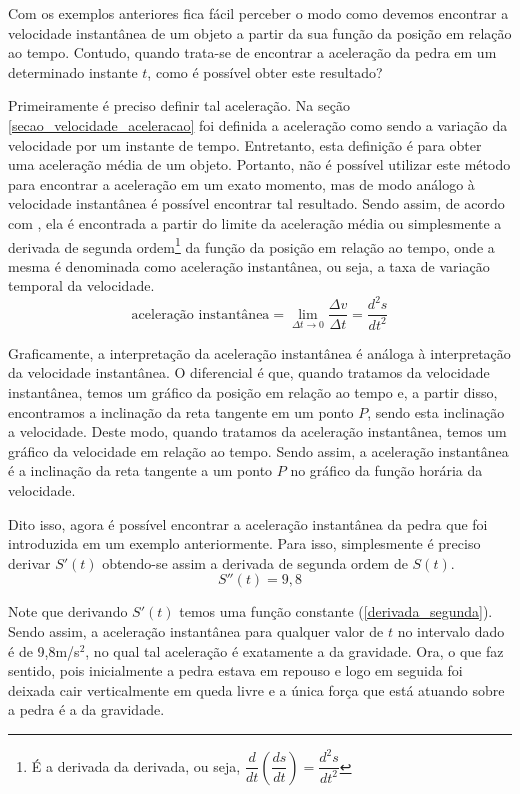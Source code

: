 \documentclass[
	12pt,				%
	openright,			%
    twoside,			%
	a4paper,			%
	chapter=TITLE,		%
	english,			%
	french,				%
	spanish,			%
	brazil				%
	]{abntex2}
\numberwithin{lema}{chapter}
\numberwithin{teorema}{chapter}
\numberwithin{definicao}{chapter}
\numberwithin{exemplo}{chapter}
\numberwithin{figure}{chapter}
\begin{document}
Com os exemplos anteriores fica fácil perceber o modo como devemos encontrar a velocidade instantânea de um objeto a partir da sua função da posição em relação ao tempo. Contudo, quando trata-se de encontrar a aceleração da pedra em um determinado instante $t$, como é possível obter este resultado? 

Primeiramente é preciso definir tal aceleração. Na seção \ref{secao_velocidade_aceleracao} foi definida a aceleração como sendo a variação da velocidade por um instante de tempo. Entretanto, esta definição é para obter uma aceleração média de um objeto. Portanto, não é possível utilizar este método para encontrar a aceleração em um exato momento, mas de modo análogo à velocidade instantânea é possível encontrar tal resultado. Sendo assim, de acordo com , ela é encontrada a partir do limite da aceleração média ou simplesmente a derivada de segunda ordem\footnote{É a derivada da derivada, ou seja, $\dfrac{d}{dt}\left( \dfrac{ds}{dt} \right) = \dfrac{d^{2}s}{dt^{2}}$} da função da posição em relação ao tempo, onde a mesma é denominada como aceleração instantânea, ou seja, a taxa de variação temporal da velocidade.
\begin{equation}
	\text{aceleração instantânea} = \lim_{\Delta t\rightarrow 0} \frac{\Delta v}{\Delta t} = \dfrac{d^2s}{dt^2}
\end{equation}

Graficamente, a interpretação da aceleração instantânea é análoga à interpretação da velocidade instantânea. O diferencial é que, quando tratamos da velocidade instantânea, temos um gráfico da posição em relação ao tempo e, a partir disso, encontramos a inclinação da reta tangente em um ponto $P$, sendo esta inclinação a velocidade. Deste modo, quando tratamos da aceleração instantânea, temos um gráfico da velocidade em relação ao tempo. Sendo assim, a aceleração instantânea é a inclinação da reta tangente a um ponto $P$ no gráfico da função horária da velocidade.

Dito isso, agora é possível encontrar a aceleração instantânea da pedra que foi introduzida em um exemplo anteriormente. Para isso, simplesmente é preciso derivar $S'(t)$ obtendo-se assim a derivada de segunda ordem de $S(t)$. 
\begin{equation}
	\label{derivada_segunda}
	S''(t) = 9,8
\end{equation}

Note que derivando $S'(t)$ temos uma função constante (\ref{derivada_segunda}). Sendo assim, a aceleração instantânea para qualquer valor de $t$ no intervalo dado é de 9,8m/s$^2$, no qual tal aceleração é exatamente a da gravidade. Ora, o que faz sentido, pois inicialmente a pedra estava em repouso e logo em seguida foi deixada cair verticalmente em queda livre e a única força que está atuando sobre a pedra é a da gravidade.
\end{document}
